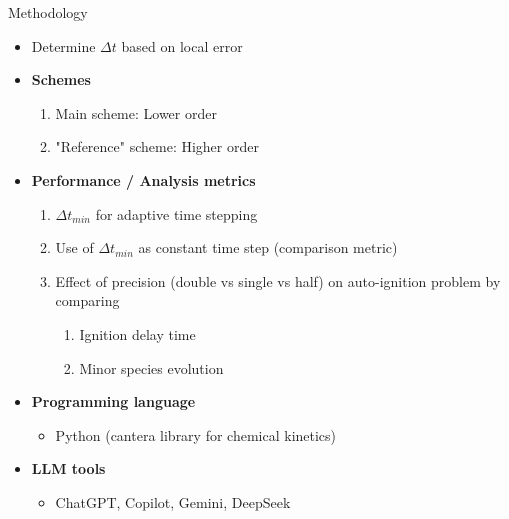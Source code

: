\documentclass{beamer}
\begin{document}
\begin{frame}{Methodology}
\begin{itemize}
    \item Determine $ \Delta t $ based on local error
    \item \textbf{Schemes}
    \begin{enumerate}
        \item Main scheme: Lower order
        \item "Reference" scheme: Higher order
    \end{enumerate}
    \item \textbf{Performance / Analysis metrics}
    \begin{enumerate}
        \item $\Delta t_{min}$ for adaptive time stepping
        \item Use of $\Delta t_{min}$ as constant time step (comparison metric)
        \item Effect of precision (double vs single vs half) on auto-ignition problem by comparing
        \begin{enumerate}
            \item Ignition delay time
            \item Minor species evolution
        \end{enumerate}
    \end{enumerate}
    \item \textbf{Programming language}
    \begin{itemize}
        \item Python (cantera library for chemical kinetics)
    \end{itemize}
    \item \textbf{LLM tools}
    \begin{itemize}
        \item ChatGPT, Copilot, Gemini, DeepSeek
    \end{itemize}
\end{itemize}
\end{frame}

\end{document}

